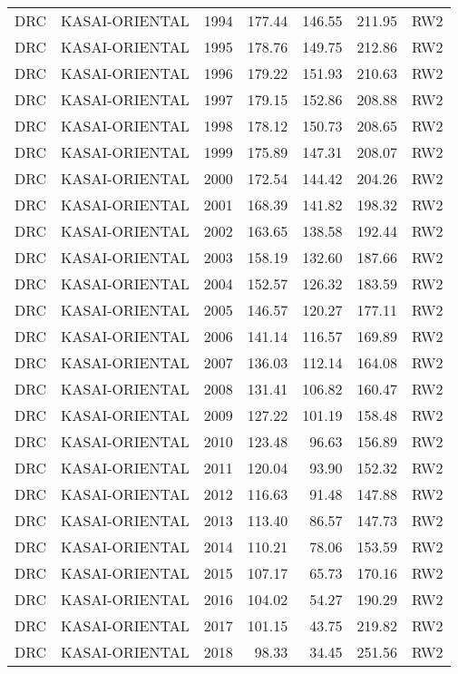 \begin{longtable}{lllrrrl}
  DRC & KASAI-ORIENTAL & 1994 & 177.44 & 146.55 & 211.95 & RW2 \\ 
  DRC & KASAI-ORIENTAL & 1995 & 178.76 & 149.75 & 212.86 & RW2 \\ 
  DRC & KASAI-ORIENTAL & 1996 & 179.22 & 151.93 & 210.63 & RW2 \\ 
  DRC & KASAI-ORIENTAL & 1997 & 179.15 & 152.86 & 208.88 & RW2 \\ 
  DRC & KASAI-ORIENTAL & 1998 & 178.12 & 150.73 & 208.65 & RW2 \\ 
  DRC & KASAI-ORIENTAL & 1999 & 175.89 & 147.31 & 208.07 & RW2 \\ 
  DRC & KASAI-ORIENTAL & 2000 & 172.54 & 144.42 & 204.26 & RW2 \\ 
  DRC & KASAI-ORIENTAL & 2001 & 168.39 & 141.82 & 198.32 & RW2 \\ 
  DRC & KASAI-ORIENTAL & 2002 & 163.65 & 138.58 & 192.44 & RW2 \\ 
  DRC & KASAI-ORIENTAL & 2003 & 158.19 & 132.60 & 187.66 & RW2 \\ 
  DRC & KASAI-ORIENTAL & 2004 & 152.57 & 126.32 & 183.59 & RW2 \\ 
  DRC & KASAI-ORIENTAL & 2005 & 146.57 & 120.27 & 177.11 & RW2 \\ 
  DRC & KASAI-ORIENTAL & 2006 & 141.14 & 116.57 & 169.89 & RW2 \\ 
  DRC & KASAI-ORIENTAL & 2007 & 136.03 & 112.14 & 164.08 & RW2 \\ 
  DRC & KASAI-ORIENTAL & 2008 & 131.41 & 106.82 & 160.47 & RW2 \\ 
  DRC & KASAI-ORIENTAL & 2009 & 127.22 & 101.19 & 158.48 & RW2 \\ 
  DRC & KASAI-ORIENTAL & 2010 & 123.48 & 96.63 & 156.89 & RW2 \\ 
  DRC & KASAI-ORIENTAL & 2011 & 120.04 & 93.90 & 152.32 & RW2 \\ 
  DRC & KASAI-ORIENTAL & 2012 & 116.63 & 91.48 & 147.88 & RW2 \\ 
  DRC & KASAI-ORIENTAL & 2013 & 113.40 & 86.57 & 147.73 & RW2 \\ 
  DRC & KASAI-ORIENTAL & 2014 & 110.21 & 78.06 & 153.59 & RW2 \\ 
  DRC & KASAI-ORIENTAL & 2015 & 107.17 & 65.73 & 170.16 & RW2 \\ 
  DRC & KASAI-ORIENTAL & 2016 & 104.02 & 54.27 & 190.29 & RW2 \\ 
  DRC & KASAI-ORIENTAL & 2017 & 101.15 & 43.75 & 219.82 & RW2 \\ 
  DRC & KASAI-ORIENTAL & 2018 & 98.33 & 34.45 & 251.56 & RW2 \\ 

\end{longtable}

